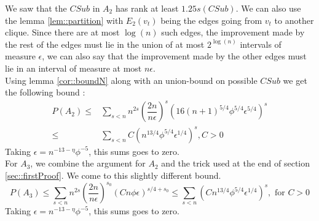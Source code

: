 We saw that the $CSub$ in $A_2$ has rank at least $1.25s(CSub)$. We can also use the lemma \ref{lem::partition} with $E_2(v_t)$ being the edges going from $v_t$ to another clique. Since there are at most $\log(n)$ such edges, the improvement made by the rest of the edges must lie in the union of at most $2^{\log(n)}$ intervals of measure $\epsilon$, we can also say that the improvement made by the other edges must lie in an interval of measure at most $n\epsilon$.\\
Using lemma \ref{cor::boundN} along with an union-bound on possible $CSub$ we get the following bound :
 \begin{equation*}
 \begin{split}
 P(A_2) \leq &\sum_{s<n}n^{2s}\left(\dfrac{2n}{n\epsilon}\right)^s (16(n + 1)^{5/4}\phi^{5/4}\epsilon^{5/4})^s \\
 \leq & \sum_{s<n} C(n^{13/4}\phi^{5/4}\epsilon^{1/4})^s,  C > 0
 \end{split}
 \end{equation*}
 Taking $\epsilon = n^{-13-\eta}\phi^{-5}$, this sums goes to zero.\\
 
 For $A_3$, we combine the argument for $A_2$ and the trick used at the end of section \ref{sec::firstProof}. We come to this slightly different bound.
 \begin{equation*}
P(A_3) \leq  \sum_{s < n}n^{2s}\left(\dfrac{2n}{n\epsilon}\right)^{s_0}(Cn\phi\epsilon)^{s/4 + s_0} \leq \sum_{s < n}(Cn^{13/4}\phi^{5/4}\epsilon^{1/4})^{s}, \text{ for } C > 0 
\end{equation*}
 Taking $\epsilon = n^{-13-\eta}\phi^{-5}$, this sums goes to zero.
